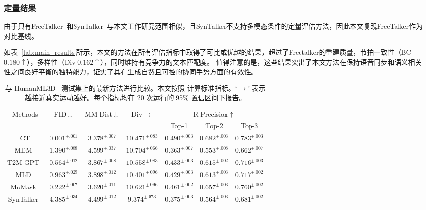 \subsubsection{定量结果}
由于只有FreeTalker~\cite{yang2024freetalker}和SynTalker~\cite{chen2024syntalker}与本文工作研究范围相似，且SynTalker不支持多模态条件的定量评估方法，因此本文复现FreeTalker作为对比基线。

如表~\ref{tab:main_results}所示，本文的方法在所有评估指标中取得了可比或优越的结果，超过了Freetalker的重建质量，节拍一致性（BC $0.180\uparrow$），多样性（Div $0.162\uparrow$），同时维持有竞争力的文本匹配度。
值得注意的是，这些结果突出了本文方法在保持语音同步和语义相关性之间良好平衡的独特能力，证实了其在生成自然且可控的协同手势方面的有效性。



\begin{table*}[t]
  \centering
  \caption{与 HumanML3D~\cite{guo2022humanml3d} 测试集上的最新方法进行比较。本文按照 \cite{chen2023executing} 计算标准指标。`$\rightarrow$' 表示越接近真实运动越好。每个指标均在 20 次运行的 95\% 置信区间下报告。}
  \label{tab:h3d_results}
  \small
  \begin{tabular}{c cccccc}
  \toprule
  \multirow{2}{*}{Methods} & \multirow{2}{*}{FID$\downarrow$} & \multirow{2}{*}{MM-Dist$\downarrow$} & \multirow{2}{*}{Div$\rightarrow$} & \multicolumn{3}{c}{R-Precision$\uparrow$} \\
  \cmidrule(lr){5-7}
  & & & & Top-1 & Top-2 & Top-3 \\
  \midrule
  GT  &  $0.001^{\pm .001}$ & $3.378^{\pm .007}$ & $10.471^{\pm .083}$ &  $0.490^{\pm .003}$ & $0.682^{\pm .003}$ & $0.783^{\pm .003}$ \\
  MDM~\cite{tevet2022mdm} & $1.390^{\pm .088}$ & $4.599^{\pm .037}$ & $10.704^{\pm .066}$ & $0.363^{\pm .007}$ & $0.553^{\pm .008}$ & $0.662^{\pm .007}$ \\
  T2M-GPT~\cite{zhang2023t2mgpt} &  $0.564^{\pm .012}$ & $3.867^{\pm .008}$ & $10.558^{\pm .083}$  & $0.433^{\pm .003}$ & $0.615^{\pm .002}$ & $0.716^{\pm .003}$ \\
  MLD~\cite{chen2023executing} & $0.963^{\pm .029}$ & $3.898^{\pm .012}$ & $10.401^{\pm .096}$ & $0.429^{\pm .003}$ & $0.613^{\pm .003}$ & $0.717^{\pm .002}$ \\
  MoMask~\cite{guo2024momask} & $0.222^{\pm .007}$ & $3.620^{\pm .011}$ & $10.621^{\pm .096}$ & $0.461^{\pm .002}$ & $0.657^{\pm .003}$ & $0.760^{\pm .002}$ \\
  SynTalker~\cite{chen2024syntalker} & $4.385^{\pm .034}$ & $4.499^{\pm .012}$ & $9.374^{\pm .073}$ & $0.375^{\pm .003}$ & $0.564^{\pm .003}$ & $0.681^{\pm .002}$ \\

\end{tabular}
\end{table*}
